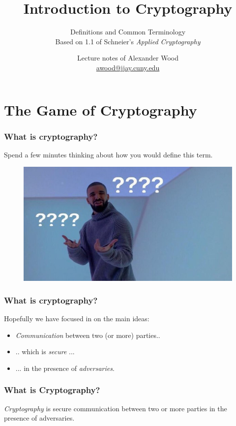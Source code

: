 \documentclass{beamer}
\title[OOP]{Introduction to Cryptography}
\subtitle{Definitions and Common Terminology \\ Based on 1.1 of Schneier's \emph{Applied Cryptography}}
\author
{Lecture notes of Alexander Wood \\ \scriptsize \href{mailto:awood@jjay.cuny.edu}{awood@jjay.cuny.edu}}
\institute[JJay]{John Jay College of Criminal Justice}
\date{}
\newcommand{\<}{\langle}
\renewcommand{\>}{\rangle}
\begin{document}

\begin{frame}
  \titlepage
\end{frame}

\section{The Game of Cryptography}


\begin{frame}
\frametitle{What is cryptography?}

Spend a few minutes thinking about how you would define this term. 

\begin{figure}
\includegraphics[scale=.4]{IMG/drake.jpg}
\end{figure}
\end{frame}

\begin{frame}
\frametitle{What is cryptography?}

Hopefully we have focused in on the main ideas:
\begin{itemize}
\item \pause \emph{Communication} between two (or more) parties..
\item \pause .. which is \emph{secure} ...
\item \pause ... in the presence of \emph{adversaries}.
\end{itemize}
\end{frame}


\begin{frame}
\frametitle{What is Cryptography?}

\emph{Cryptography} is secure communication between two or more parties in the presence of adversaries. 
\end{frame}
\end{document}

